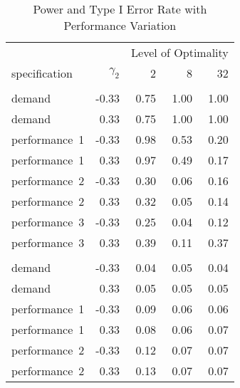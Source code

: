 \begin{table}

\caption{\label{tab:noise-table}Power and Type I Error Rate with Performance Variation}
\centering
\fontsize{9}{11}\selectfont
\begin{threeparttable}
\begin{tabular}[t]{lrrrr}
\toprule
\multicolumn{1}{c}{ } & \multicolumn{1}{c}{ } & \multicolumn{3}{c}{Level of Optimality} \\
\cmidrule(l{3pt}r{3pt}){3-5}
specification & $\gamma_2$ & 2 & 8 & 32\\
\midrule
\addlinespace[0.3em]
\multicolumn{5}{c}{\textbf{Power}}\\
\hspace{1em}demand & -0.33 & 0.75 & 1.00 & 1.00\\
\hspace{1em}demand & 0.33 & 0.75 & 1.00 & 1.00\\
\hspace{1em}performance~1 & -0.33 & 0.98 & 0.53 & 0.20\\
\hspace{1em}performance~1 & 0.33 & 0.97 & 0.49 & 0.17\\
\hspace{1em}performance~2 & -0.33 & 0.30 & 0.06 & 0.16\\
\hspace{1em}performance~2 & 0.33 & 0.32 & 0.05 & 0.14\\
\hspace{1em}performance~3 & -0.33 & 0.25 & 0.04 & 0.12\\
\hspace{1em}performance~3 & 0.33 & 0.39 & 0.11 & 0.37\\
\addlinespace[0.3em]
\multicolumn{5}{c}{\textbf{Type I}}\\
\hspace{1em}demand & -0.33 & 0.04 & 0.05 & 0.04\\
\hspace{1em}demand & 0.33 & 0.05 & 0.05 & 0.05\\
\hspace{1em}performance~1 & -0.33 & 0.09 & 0.06 & 0.06\\
\hspace{1em}performance~1 & 0.33 & 0.08 & 0.06 & 0.07\\
\hspace{1em}performance~2 & -0.33 & 0.12 & 0.07 & 0.07\\
\hspace{1em}performance~2 & 0.33 & 0.13 & 0.07 & 0.07\\

\end{tabular}
\end{threeparttable}
\end{table}
